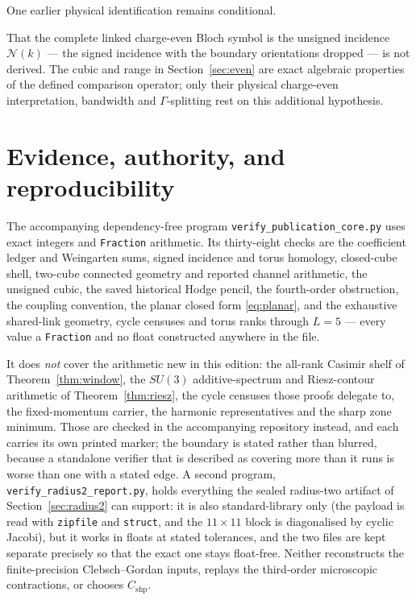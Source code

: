 \documentclass[11pt]{article}
\theoremstyle{plain}
\theoremstyle{definition}
\theoremstyle{remark}
\begin{document}
One earlier physical identification remains conditional.

That the complete linked charge-even Bloch symbol is the unsigned incidence
$\mathcal N(k)$ --- the signed incidence with the boundary orientations
dropped --- is not derived. The cubic and range in Section~\ref{sec:even} are
exact algebraic properties of the defined comparison operator; only their
physical charge-even interpretation, bandwidth and $\Gamma$-splitting rest on
this additional hypothesis.

\section{Evidence, authority, and reproducibility}
\label{sec:repro}

The accompanying dependency-free program
\texttt{verify\_publication\_core.py} uses exact integers and
\texttt{Fraction} arithmetic. Its thirty-eight checks are the coefficient
ledger and Weingarten sums, signed incidence and torus homology, closed-cube
shell, two-cube connected geometry and reported channel arithmetic, the
unsigned cubic, the saved historical Hodge pencil, the fourth-order
obstruction, the coupling convention, the planar closed form
\eqref{eq:planar}, and the exhaustive shared-link geometry, cycle censuses
and torus ranks through $L=5$ --- every value a \texttt{Fraction} and no
float constructed anywhere in the file.

It does \emph{not} cover the arithmetic new in this edition: the all-rank
Casimir shelf of Theorem~\ref{thm:window}, the $SU(3)$ additive-spectrum and
Riesz-contour arithmetic of Theorem~\ref{thm:riesz}, the cycle censuses those
proofs delegate to, the fixed-momentum carrier, the harmonic representatives
and the sharp zone minimum. Those are checked in the accompanying repository
instead, and each carries its own printed marker; the boundary is stated
rather than blurred, because a standalone verifier that is described as
covering more than it runs is worse than one with a stated edge. A second
program, \texttt{verify\_radius2\_report.py}, holds everything the sealed
radius-two artifact of Section~\ref{sec:radius2} can support: it is also
standard-library only (the payload is read with \texttt{zipfile} and
\texttt{struct}, and the $11\times11$ block is diagonalised by cyclic
Jacobi), but it works in floats at stated tolerances, and the two files are
kept separate precisely so that the exact one stays float-free. Neither
reconstructs the finite-precision Clebsch--Gordan inputs, replays the
third-order microscopic contractions, or chooses $C_{\mathrm{shp}}$.
\end{document}
